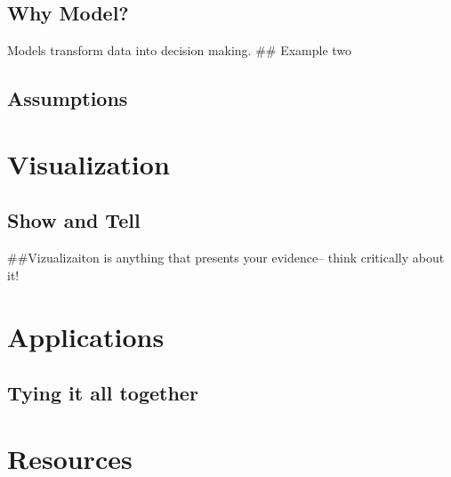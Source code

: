 \documentclass[]{book}
\begin{document}
\hypertarget{why-model}{%
\section{Why Model?}\label{why-model}}

Models transform data into decision making.
\#\# Example two

\hypertarget{assumptions}{%
\section{Assumptions}\label{assumptions}}

\hypertarget{visualization}{%
\chapter{Visualization}\label{visualization}}

\hypertarget{show-and-tell}{%
\section{Show and Tell}\label{show-and-tell}}

\#\#Vizualizaiton is anything that presents your evidence-- think critically about it!

\hypertarget{applications}{%
\chapter{Applications}\label{applications}}

\hypertarget{tying-it-all-together}{%
\section{Tying it all together}\label{tying-it-all-together}}

\hypertarget{resources}{%
\chapter{Resources}\label{resources}}


\end{document}
